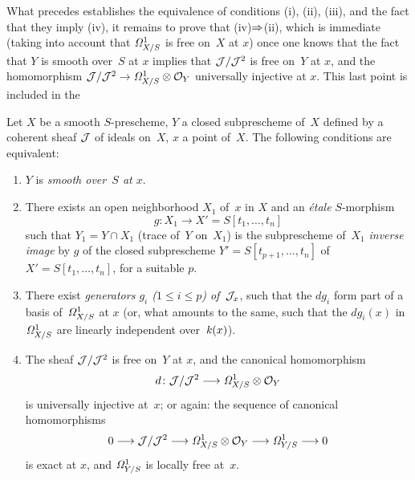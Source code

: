 What precedes establishes the equivalence of conditions
(i), (ii), (iii), and the fact that they imply (iv), it remains to
prove that (iv)$\To$(ii), which is immediate (taking into
account that $\it{\Omega}^1_{X/S}$ is free on~$X$ at $x$) once
one knows that the fact that $Y$ is smooth over~$S$ at $x$ implies that
$\cal{J}/\cal{J}^2$ is free on~$Y$ at $x$, and the homomorphism
$\cal{J}/\cal{J}^2 \to \it{\Omega}^1_{X/S}\otimes \cal{O}_Y$
universally injective at $x$. This last point is included in the
\begin{theorem}
\label{II.4.10}
Let $X$ be a smooth $S$-prescheme, $Y$ a
closed subprescheme of~$X$ defined by a coherent sheaf
$\cal{J}$ of ideals on~$X$, $x$ a point of~$X$. The
following conditions are equivalent:
\begin{enumerate}
\item[(i)] $Y$ is \emph{smooth over~$S$ at $x$}.
\item[(ii)] There exists an open neighborhood $X_1$ of~$x$ in $X$ and an
\emph{\'etale} $S$-morphism
\[
g\colon X_1 \to X'=S[t_1,\dots,t_n]
\]
such that $Y_1=Y \cap X_1$ (trace of~$Y$ on~$X_1$) is the
subprescheme of~$X_1$ \emph{inverse image} by $g$ of the
closed subprescheme $Y'=S[t_{p+1},\dots,t_n]$ of
$X'=S[t_1,\dots,t_n]$, for a suitable $p$.
\item[(iii)] There exist \emph{generators $g_i$ ($1 \leq i
\leq p$) of~$\cal{J}_x$}, such that the $dg_i$ form part of a
basis of~$\it{\Omega}^1_{X/S}$ at $x$ (or, what amounts to the same,
such that the $dg_i(x)$ in $\it{\Omega}^1_{X/S}$ are
linearly independent over~$\kres(x)$).
\item[(iv)] The sheaf $\cal{J}/\cal{J}^2$ is free on~$Y$ at $x$,
and the canonical homomorphism
\[
d\colon \cal{J}/\cal{J}^2 \to \it{\Omega}^1_{X/S}\otimes \cal{O}_Y
\]
is universally injective at~$x$; or again: the sequence
of canonical homomorphisms
\[
0 \to \cal{J}/\cal{J}^2 \to \it{\Omega}^1_{X/S}\otimes \cal{O}_Y \to
\it{\Omega}^1_{Y/S} \to 0
\]
is exact at $x$, and $\it{\Omega}^1_{Y/S}$ is locally free
at~$x$.
\end{enumerate}
\end{theorem}

